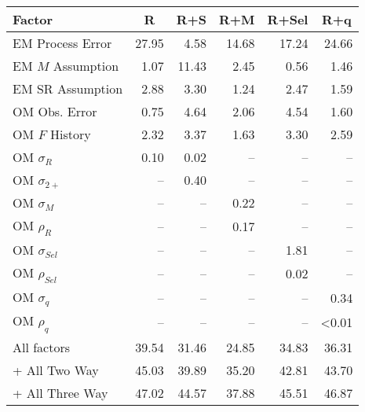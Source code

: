 \begin{center}
\begin{tabular}{lrrrrr}
\hline\hline
\multicolumn{1}{l}{Factor}&\multicolumn{1}{c}{R}&\multicolumn{1}{c}{R+S}&\multicolumn{1}{c}{R+M}&\multicolumn{1}{c}{R+Sel}&\multicolumn{1}{c}{R+q}\tabularnewline
\hline
EM Process Error&27.95& 4.58&14.68&17.24&24.66\tabularnewline
EM $M$ Assumption& 1.07&11.43& 2.45& 0.56& 1.46\tabularnewline
EM SR Assumption& 2.88& 3.30& 1.24& 2.47& 1.59\tabularnewline
OM Obs. Error& 0.75& 4.64& 2.06& 4.54& 1.60\tabularnewline
OM $F$ History& 2.32& 3.37& 1.63& 3.30& 2.59\tabularnewline
OM $\sigma_R$& 0.10& 0.02&--&--&--\tabularnewline
OM $\sigma_{2+}$ &--& 0.40&--&--&--\tabularnewline
OM $\sigma_M$&--&--& 0.22&--&--\tabularnewline
OM $\rho_R$&--&--& 0.17&--&--\tabularnewline
OM $\sigma_{Sel}$&--&--&--& 1.81&--\tabularnewline
OM $\rho_{Sel}$&--&--&--& 0.02&--\tabularnewline
OM $\sigma_q$&--&--&--&--& 0.34\tabularnewline
OM $\rho_q$&--&--&--&--&\textless  0.01\tabularnewline
All factors&39.54&31.46&24.85&34.83&36.31\tabularnewline
+ All Two Way&45.03&39.89&35.20&42.81&43.70\tabularnewline
+ All Three Way&47.02&44.57&37.88&45.51&46.87\tabularnewline
\hline
\end{tabular}\end{center}
